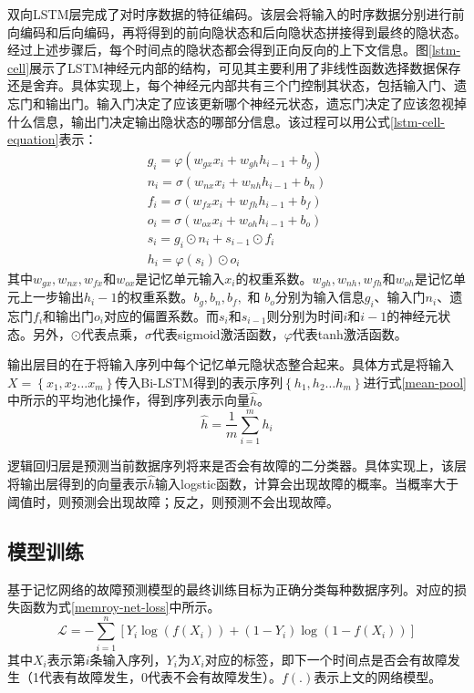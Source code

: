 双向LSTM层完成了对时序数据的特征编码。该层会将输入的时序数据分别进行前向编码和后向编码，再将得到的前向隐状态和后向隐状态拼接得到最终的隐状态。经过上述步骤后，每个时间点的隐状态都会得到正向反向的上下文信息。图\ref{lstm-cell}展示了LSTM神经元内部的结构，可见其主要利用了非线性函数选择数据保存还是舍弃。具体实现上，每个神经元内部共有三个门控制其状态，包括输入门、遗忘门和输出门。输入门决定了应该更新哪个神经元状态，遗忘门决定了应该忽视掉什么信息，输出门决定输出隐状态的哪部分信息。该过程可以用公式\ref{lstm-cell-equation}表示：
\begin{equation}
    \begin{array}{l}
    g_{i}=\varphi\left(w_{g x} x_{i}+w_{g h} h_{i - 1}+b_{g}\right) \\
    n_{i}=\sigma\left(w_{n x} x_{i}+w_{n h} h_{i- 1}+b_{n}\right) \\
    f_{i}=\sigma\left(w_{f x} x_{i}+w_{f h} h_{i- 1}+b_{f}\right) \\
    o_{i}=\sigma\left(w_{o x} x_{i}+w_{o h} h_{i- 1}+b_{o}\right) \\
    s_{i}=g_{i} \odot n_{i}+s_{i -1} \odot f_{i} \\
    h_{i}=\varphi\left(s_{i}\right) \odot o_{i}
    \end{array}
    \label{lstm-cell-equation}
\end{equation}
其中$w_{gx}, w_{nx}, w_{fx} $和$w_{ox} $是记忆单元输入$x_{i}$的权重系数。$w_{gh}, w_{nh}, w_{fh} $和$w_{oh} $是记忆单元上一步输出$h_{i}-1$的权重系数。$b_{g}, b_{n}, b_{f},$ 和 $b_{o}$分别为输入信息$g_{i}$、输入门$n_{i}$、遗忘门$f_{i}$和输出门$o_{i}$对应的偏置系数。而$s_{i}$和$s_{i-1}$则分别为时间$i$和$i-1$的神经元状态。另外，$\odot$代表点乘，$\sigma$代表sigmoid激活函数，$\varphi$代表tanh激活函数。

输出层目的在于将输入序列中每个记忆单元隐状态整合起来。具体方式是将输入$X=\left\{x_{1}, x_{2} \ldots x_{m}\right\}$传入Bi-LSTM得到的表示序列$\left\{h_{1}, h_{2} \ldots h_{m}\right\}$进行式\ref{mean-pool}中所示的平均池化操作，得到序列表示向量$\widehat{h}$。
\begin{equation}
    \widehat{h}=\frac{1}{m} \sum_{i=1}^{m} h_{i}
    \label{mean-pool}
\end{equation}

逻辑回归层是预测当前数据序列将来是否会有故障的二分类器。具体实现上，该层将输出层得到的向量表示$\widehat{h}$输入logstic函数，计算会出现故障的概率。当概率大于阈值时，则预测会出现故障；反之，则预测不会出现故障。

\subsection{模型训练}
基于记忆网络的故障预测模型的最终训练目标为正确分类每种数据序列。对应的损失函数为式\ref{memroy-net-loss}中所示。
\begin{equation}
    \mathcal{L}=-\sum_{i=1}^{n}\left[Y_{i} \log \left(f\left(X_{i} \right)\right)+\left(1-Y_{i}\right) \log \left(1-f\left(X_{i} \right)\right)\right]
    \label{memroy-net-loss}
\end{equation}
其中$X_{i}$表示第$i$条输入序列，$Y_{i}$为$X_{i}$对应的标签，即下一个时间点是否会有故障发生（1代表有故障发生，0代表不会有故障发生）。$f\left(.\right)$表示上文的网络模型。
